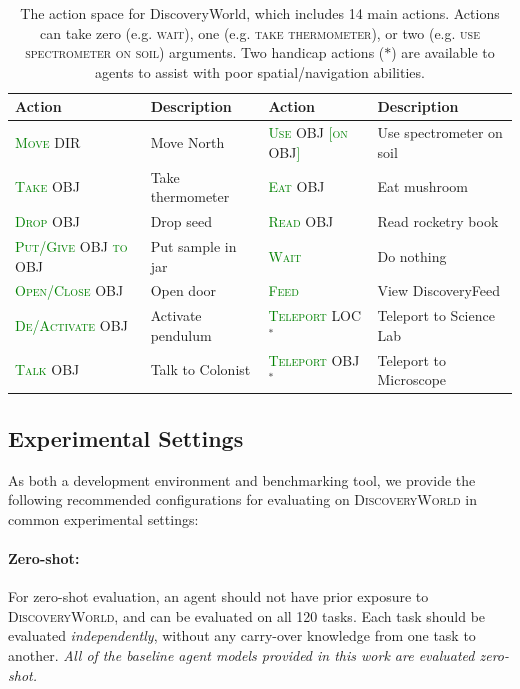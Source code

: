 \documentclass{article}
\newcommand{\blue}[1]{\textcolor{Cerulean}{\textsc{#1}}}
\newcommand{\green}[1]{\textcolor{Green}{\textsc{#1}}}
\newcommand{\env}{\textsc{DiscoveryWorld}\xspace}
\begin{document}
\begin{table}[ht]
\centering
\footnotesize
\caption{\footnotesize The action space for DiscoveryWorld, which includes 14 main actions.  Actions can take zero (e.g. \textsc{wait}), one (e.g. \textsc{take thermometer}), or two (e.g. \textsc{use spectrometer on soil}) arguments. Two handicap actions ($*$) are available to agents to assist with poor spatial/navigation abilities.}
\label{tab:action_space}
\begin{tabular}{p{3.1cm}p{3cm}p{2.7cm}p{3.2cm}}
\toprule
\textbf{Action} &   \textbf{Description}                        &   \textbf{Action} &   \textbf{Description}    \\
\midrule
\green{Move} \blue{DIR} & Move North                            &   \green{Use} \blue{OBJ} \green{[on} \blue{OBJ}\green{]} & Use spectrometer on soil        \\
\green{Take} \blue{OBJ} & Take thermometer                      &   \green{Eat} \blue{OBJ} & Eat mushroom        \\
\green{Drop} \blue{OBJ} & Drop seed                             &   \green{Read} \blue{OBJ} & Read rocketry book         \\
\green{Put/Give} \blue{OBJ} \green{to} \blue{OBJ}    & Put sample in jar  &   \green{Wait} & Do nothing        \\
\green{Open/Close} \blue{OBJ} & Open door                       &   \green{Feed} & View DiscoveryFeed        \\
\green{De/Activate} \blue{OBJ} & Activate pendulum              &   \green{Teleport} \blue{LOC} $^{*}$ & Teleport to Science Lab        \\
\green{Talk} \blue{OBJ} & Talk to Colonist                      &   \green{Teleport} \blue{OBJ} $^{*}$ & Teleport to Microscope         \\
\bottomrule        
\end{tabular}
\end{table}

\subsection{Experimental Settings}
\label{sec:train_eval_splits}

As both a development environment and benchmarking tool, we provide the following recommended configurations for evaluating on \env in common experimental settings:

\paragraph{Zero-shot:} For zero-shot evaluation, an agent should not have prior exposure to \env, and can be evaluated on all 120 tasks.  Each task should be evaluated \textit{independently}, without any carry-over knowledge from one task to another.  \textit{All of the baseline agent models provided in this work are evaluated zero-shot.}
\end{document}
